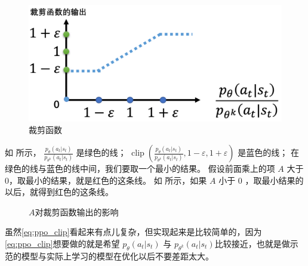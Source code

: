 \begin{figure}[htb]
    \centering
    \includegraphics[width=0.3\linewidth]{res/ch5/5.11}
    \caption{裁剪函数}
    \label{fig:fig5.11}
\end{figure}

如 所示，
    $\frac{p_{\theta}\left(a_{t} | s_{t}\right)}{p_{\theta^{k}}\left(a_{t} | s_{t}\right)}$ 是绿色的线；
    $\operatorname{clip}\left(\frac{p_{\theta}\left(a_{t} | s_{t}\right)}{p_{\theta^{k}}\left(a_{t} | s_{t}\right)}, 1-\varepsilon, 1+\varepsilon\right)$ 是蓝色的线；
    在绿色的线与蓝色的线中间，我们要取一个最小的结果。
    假设前面乘上的项 $A$ 大于 0，取最小的结果，就是红色的这条线。
如 所示，如果 $A$ 小于 0 ，取最小结果的以后，就得到红色的这条线。

\begin{figure}[htb]
    \centering
    \caption{$A$对裁剪函数输出的影响}
    \label{fig:}
\end{figure}


虽然\eqref{eq:ppo_clip}看起来有点儿复杂，但实现起来是比较简单的，因为\eqref{eq:ppo_clip}想要做的就是希望 $p_{\theta}(a_{t} | s_{t})$ 与 $p_{\theta^k}(a_{t} | s_{t})$比较接近，也就是做示范的模型与实际上学习的模型在优化以后不要差距太大。

